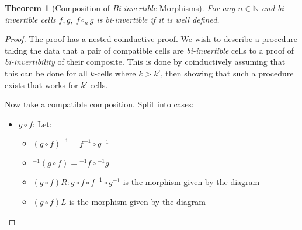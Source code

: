 \documentclass{article}
\newtheorem{theorem}{Theorem}
\theoremstyle{definition}
\theoremstyle{examplestyle}
\newcommand{\linv}[1]{{}^{-1}\!#1}
\newcommand{\rinv}[1]{#1^{-1}}
\begin{document}
\begin{theorem}[Composition of \emph{Bi-invertible} Morphisms]
  For any \(n \in \mathbb{N}\) and \emph{bi-invertible} cells \(f,g\), \(f \circ_n g\) is \emph{bi-invertible} if it is well defined.
\end{theorem}
\begin{proof}
  The proof has a nested coinductive proof. We wish to describe a procedure taking the data that a pair of compatible cells are \emph{bi-invertible} cells to a proof of \emph{bi-invertibility} of their composite. This is done by coinductively assuming that this can be done for all \(k\)-cells where \(k>k'\), then showing that such a procedure exists that works for \(k'\)-cells.

  Now take a compatible composition. Split into cases:
  \begin{itemize}
  \item \(g \circ f\): Let:
    \begin{itemize}
      \item \(\rinv {(g \circ f)} = \rinv f \circ \rinv g\)
      \item \(\linv {(g \circ f)} = \linv f \circ \linv g\)
      \item \((g \circ f)R : g \circ f \circ \rinv f \circ \rinv g\) is the morphism given by the diagram
        \begin{center}
        \end{center}
      \item \((g \circ f)L\) is the morphism given by the diagram
        \begin{center}
          \begin{tikzpicture}

\end{tikzpicture}
\end{center}
\end{itemize}
\end{itemize}
\end{proof}
\end{document}
